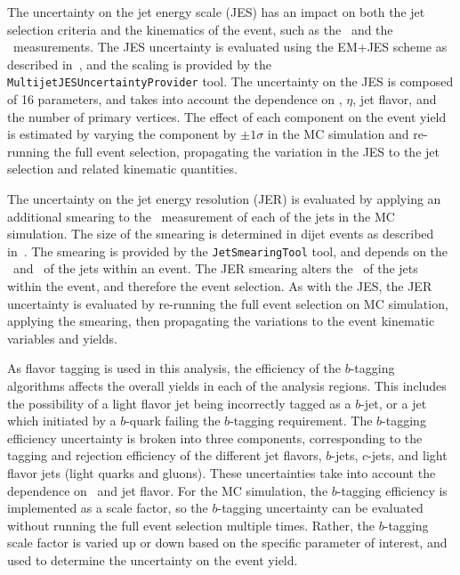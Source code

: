 The uncertainty on the jet energy scale (JES) has an impact on both the jet
selection criteria and the kinematics of the event, such as the \HT\ and the
\MET\ measurements.
The JES uncertainty is evaluated using the EM+JES scheme as described
in~\cite{JES}, and the scaling is provided by the
\texttt{MultijetJESUncertaintyProvider} tool.
The uncertainty on the JES is composed of 16 parameters, and takes into account
the dependence on \pt, $\eta$, jet flavor, and the number of primary vertices.
The effect of each component on the event yield is estimated by varying the
component by $\pm 1 \sigma$ in the MC simulation and re-running the full event
selection, propagating the variation in the JES to the jet selection and related
kinematic quantities.

The uncertainty on the jet energy resolution (JER) is evaluated by applying an
additional smearing to the \pt\ measurement of each of the jets in the MC
simulation.
The size of the smearing is determined in dijet events as described
in~\cite{JER}.
The smearing is provided by the \texttt{JetSmearingTool} tool, and depends on
the \pt\ and \eta\ of the jets within an event.
The JER smearing alters the \pt\ of the jets within the event, and therefore
the event selection.
As with the JES, the JER uncertainty is evaluated by re-running the full event
selection on MC simulation, applying the smearing, then propagating the
variations to the event kinematic variables and yields.

As flavor tagging is used in this analysis, the efficiency of the $b$-tagging
algorithms affects the overall yields in each of the analysis regions.
This includes the possibility of a light flavor jet being incorrectly tagged
as a $b$-jet, or a jet which initiated by a $b$-quark failing the $b$-tagging
requirement.
The $b$-tagging efficiency uncertainty is broken into three components,
corresponding to the tagging and rejection efficiency of the different jet
flavors, $b$-jets, $c$-jets, and light flavor jets (light quarks and gluons).
These uncertainties take into account the dependence on \pt\ and jet flavor.
For the MC simulation, the $b$-tagging efficiency is implemented as a scale
factor, so the $b$-tagging uncertainty can be evaluated without running the
full event selection multiple times.
Rather, the $b$-tagging scale factor is varied up or down based on the specific
parameter of interest, and used to determine the uncertainty on the event yield.


